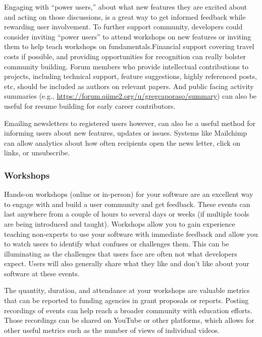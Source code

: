 \documentclass{article}
\begin{document}
Engaging with  “power users,” about what new features they are excited about and acting on those discussions, is a great way to get informed feedback while rewarding user involvement. To further support community, developers could consider inviting “power users” to attend workshops on new features or inviting them to help teach workshops on fundamentals.Financial support covering travel costs if possible, and providing opportunities for recognition can really bolster community building. Forum members who provide intellectual contributions to projects, including technical support, feature suggestions, highly referenced posts, etc, should be included as authors on relevant papers. And public facing activity summaries (e.g., \url{https://forum.qiime2.org/u/gregcaporaso/summary}) can also be useful for resume building for early career contributors.

Emailing newsletters to registered users however, can also be a useful method for informing users about new features, updates or issues. Systems like Mailchimp \cite{mailchimp} can allow analytics about how often recipients open the news letter, click on links, or unsubscribe.

\subsubsection{Workshops}
Hands-on workshops (online\cite{dillon_experiences_2021} or in-person) for your software are an excellent way to engage with and build a user community and get feedback. These events can last anywhere from a couple of hours to several days or weeks (if multiple tools are being introduced and taught). Workshops allow you to gain experience teaching non-experts to use your software with immediate feedback and allow you to watch users to identify what confuses or challenges them. This can be illuminating as the challenges that users face are often not what developers expect. Users will also generally share what they like and don’t like about your software at these events. 

The quantity, duration, and attendance at your workshops are valuable metrics that can be reported to funding agencies in grant proposals or reports. Posting recordings of events can help reach a broader community with education efforts. Those recordings can be shared on YouTube or other platforms, which allows for other useful metrics such as the number of views of individual videos. 
\end{document}

